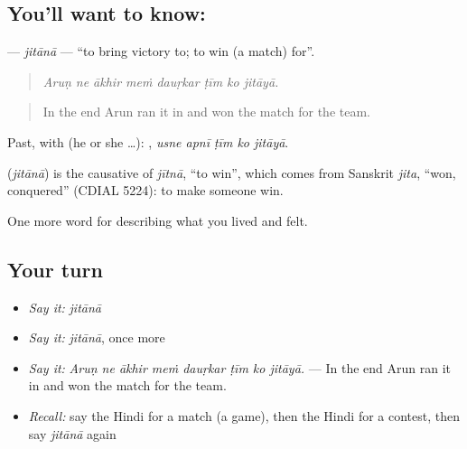 \subsection*{You'll want to know: }
\textbf{} — \emph{jitānā} — \textquotedblleft{}to bring victory to; to win (a match) for\textquotedblright{}.

\begin{quote}
       
\end{quote}

\begin{quote}
\emph{Aruṇ ne ākhir meṁ dauṛkar ṭīm ko jitāyā.}
\end{quote}

\begin{quote}
In the end Arun ran it in and won the match for the team.
\end{quote}

Past, with  (he or she …):     , \emph{usne apnī ṭīm ko jitāyā}.

\begin{cousinweb}
\textbf{} (\emph{jitānā}) is the causative of \emph{jītnā}, \textquotedblleft{}to win\textquotedblright{}, which comes from Sanskrit \emph{jita}, \textquotedblleft{}won, conquered\textquotedblright{} (CDIAL 5224): to make someone win.
\end{cousinweb}

\begin{grammarlens}[title={What you've built}]
One more word for describing what you lived and felt.
\end{grammarlens}

\subsection*{Your turn}
\begin{itemize}
\raggedright
  \item \emph{Say it:} \emph{jitānā}
  \item \emph{Say it:} \emph{jitānā}, once more
  \item \emph{Say it:} \emph{Aruṇ ne ākhir meṁ dauṛkar ṭīm ko jitāyā.} — In the end Arun ran it in and won the match for the team.
  \item \emph{Recall:} say the Hindi for a match (a game), then the Hindi for a contest, then say \emph{jitānā} again
\end{itemize}

